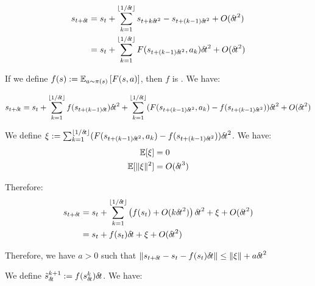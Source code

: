 
\begin{align}
  s_{t + {\delta\hspace{-.1em}t}} &= s_t + \sum_{k=1}^{\lfloor 1/{\delta\hspace{-.1em}t}\rfloor} s_{t+k{\delta\hspace{-.1em}t}^2} -  s_{t+(k-1){\delta\hspace{-.1em}t}^2} + O({\delta\hspace{-.1em}t}^2) \\
                    &= s_t + \sum_{k=1}^{\lfloor 1/{\delta\hspace{-.1em}t} \rfloor} F(s_{t+(k-1){\delta\hspace{-.1em}t}^2}, a_k){\delta\hspace{-.1em}t}^2 + O({\delta\hspace{-.1em}t}^2)
\end{align}

If we define $f(s) \mathrel{\mathop{:}}= \mathbb{E}_{a \sim \pi(s)}\left[F(s, a)\right]$, then $f$ is . We have: 

  \begin{align}
    s_{t + {\delta\hspace{-.1em}t}}   & = s_t + \sum_{k=1}^{\lfloor 1/{\delta\hspace{-.1em}t}\rfloor} f(s_{t+(k-1){\delta\hspace{-.1em}t}}){\delta\hspace{-.1em}t}^2 + \sum_{k=1}^{\lfloor 1/{\delta\hspace{-.1em}t}\rfloor} (F(s_{t+(k-1){\delta\hspace{-.1em}t}^2}, a_k) - f(s_{t+(k-1){\delta\hspace{-.1em}t}^2})){\delta\hspace{-.1em}t}^2 + O({\delta\hspace{-.1em}t}^2)        \\
  \end{align}

  We define $\xi \mathrel{\mathop{:}}= \sum_{k=1}^{\lfloor 1/{\delta\hspace{-.1em}t}\rfloor} (F(s_{t+(k-1){\delta\hspace{-.1em}t}^2}, a_k) - f(s_{t+(k-1){\delta\hspace{-.1em}t}^2})){\delta\hspace{-.1em}t}^2$. We have:
  \begin{align}
    \mathbb{E}[\xi] &= 0 \\
    \mathbb{E}[\|\xi\|^2] &= O({\delta\hspace{-.1em}t}^3)
  \end{align}

  Therefore:
  \begin{align}
  s_{t + {\delta\hspace{-.1em}t}}  &= s_t + \sum_{k=1}^{\lfloor 1/{\delta\hspace{-.1em}t}\rfloor} \left(f(s_{t}) + O(k{\delta\hspace{-.1em}t}^2)\right){\delta\hspace{-.1em}t}^2 + \xi + O({\delta\hspace{-.1em}t}^2) \\
                      & = s_t + f(s_{t}) {\delta\hspace{-.1em}t} + \xi + O({\delta\hspace{-.1em}t}^2) 
  \end{align}

  Therefore, we have $a>0$ such that $\|s_{t + {\delta\hspace{-.1em}t}} - s_t - f(s_t){\delta\hspace{-.1em}t}\| \leq \|\xi\| + a{\delta\hspace{-.1em}t}^2$
  
We define $\tilde s_{\delta\hspace{-.1em}t}^{k+1} \mathrel{\mathop{:}}= f(s_{\delta\hspace{-.1em}t}^k){\delta\hspace{-.1em}t}$. We have:


